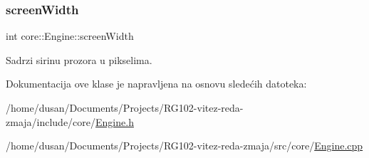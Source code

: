 \mbox{\label{classcore_1_1Engine_a69e16377fb9f9420b7147e0465abd1f7}} 
\subsubsection{\texorpdfstring{screen\+Width}{screenWidth}}
{\footnotesize\ttfamily int core\+::\+Engine\+::screen\+Width\hspace{0.3cm}{\ttfamily [private]}}



Sadrzi sirinu prozora u pikselima. 



Dokumentacija ove klase je napravljena na osnovu sledećih datoteka\+:\begin{DoxyCompactItemize}
\item 
/home/dusan/\+Documents/\+Projects/\+R\+G102-\/vitez-\/reda-\/zmaja/include/core/\hyperlink{Engine_8h}{Engine.\+h}\item 
/home/dusan/\+Documents/\+Projects/\+R\+G102-\/vitez-\/reda-\/zmaja/src/core/\hyperlink{Engine_8cpp}{Engine.\+cpp}\end{DoxyCompactItemize}
